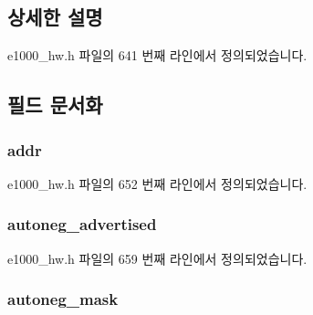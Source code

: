 \subsection{상세한 설명}


e1000\+\_\+hw.\+h 파일의 641 번째 라인에서 정의되었습니다.



\subsection{필드 문서화}
\subsubsection[{\texorpdfstring{addr}{addr}}]{ addr}\hypertarget{structe1000__phy__info_a9ac6ce0ce824ca84feafe5837fc9aa9a}{}\label{structe1000__phy__info_a9ac6ce0ce824ca84feafe5837fc9aa9a}


e1000\+\_\+hw.\+h 파일의 652 번째 라인에서 정의되었습니다.

\subsubsection[{\texorpdfstring{autoneg\+\_\+advertised}{autoneg_advertised}}]{ autoneg\+\_\+advertised}\hypertarget{structe1000__phy__info_a88fccf5fe9b00f99f2f018d60c11501f}{}\label{structe1000__phy__info_a88fccf5fe9b00f99f2f018d60c11501f}


e1000\+\_\+hw.\+h 파일의 659 번째 라인에서 정의되었습니다.

\subsubsection[{\texorpdfstring{autoneg\+\_\+mask}{autoneg_mask}}]{ autoneg\+\_\+mask}\hypertarget{structe1000__phy__info_a9b6660d966c8741c0807b053f309d139}{}\label{structe1000__phy__info_a9b6660d966c8741c0807b053f309d139}


